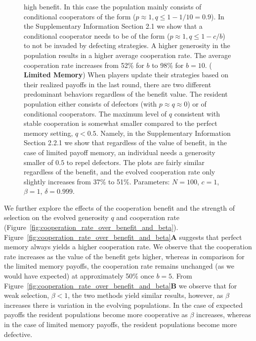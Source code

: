 \documentclass[11pt]{article}
\theoremstyle{plainCl1}
\theoremstyle{plainCl2}
\begin{document}
\begin{figure}[!htbp]
{    high benefit. In this case the population mainly consists of conditional
    cooperators of the form ($p\!\approx\!1\!, q\!\le\!1\!-\!1/10\!=\!0.9$). In
    the Supplementary Information Section 2.1 we show that a conditional
    cooperator needs to be of the form ($p\!\approx\!1\!, q\!\le\!1\!-\!c/b$) to
    not be invaded by defecting strategies. A higher generosity in the
    population results in a higher average cooperation rate. The average
    cooperation rate increases from 52\% for \(b\) to 98\% for \(b=10\). ({\bf
    Limited Memory}) When players update their strategies based on their
    realized payoffs in the last round, there are two different predominant
    behaviors regardless of the benefit value. The resident population either
    consists of defectors (with $p\!\approx\!q\!\approx\!0$) or of conditional
    cooperators. The maximum level of $q$ consistent with stable cooperation is
    somewhat smaller compared to the perfect memory setting, $q\!<\!0.5$.
    Namely, in the Supplementary Information Section 2.2.1 we show that
    regardless of the value of benefit, in the case of limited payoff memory, an
    individual needs a generosity smaller of $0.5$ to repel defectors. The plots
    are fairly similar regardless of the benefit, and the evolved cooperation
    rate only slightly increases from 37\% to 51\%. Parameters: $N\!=\!100$,
    $c\!=\!1$, $\beta\!=\!1$, $\delta\!=\!0.999$.}
    \label{fig:expected_and_stochastic_for_donation}
\end{figure}

We further explore the effects of the cooperation benefit and the strength of
selection on the evolved generosity \(q\) and cooperation rate
(Figure~\ref{fig:cooperation_rate_over_benefit_and_beta}).
Figure~\ref{fig:cooperation_rate_over_benefit_and_beta}\textbf{A} suggests that
perfect memory always yields a higher cooperation rate. We observe that the
cooperation rate increases as the value of the benefit gets higher, whereas in
comparison for the limited memory payoffs, the cooperation rate remains
unchanged (as we would have expected) at approximately 50\% once \(b=5\). From
Figure~\ref{fig:cooperation_rate_over_benefit_and_beta}\textbf{B} we observe
that for weak selection, \(\beta < 1\), the two methods yield similar results,
however, as \(\beta\) increases there is variation in the evolving populations.
In the case of expected payoffs the resident populations become more cooperative
as \(\beta\) increases, whereas in the case of limited memory payoffs, the
resident populations become more defective.
\end{document}
